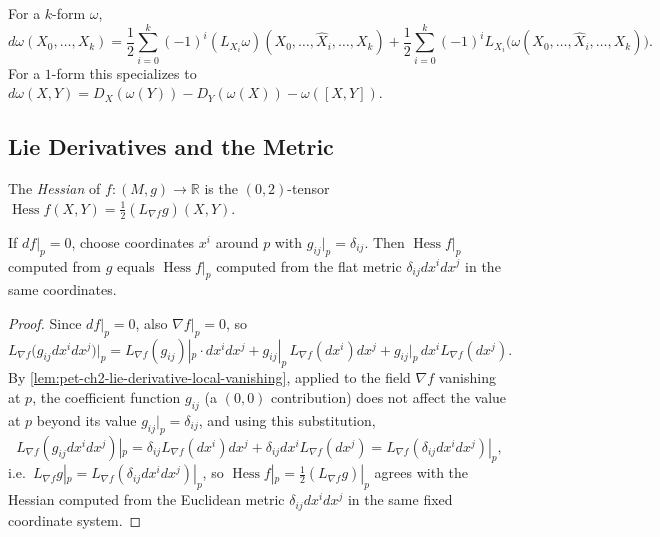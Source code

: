 \begin{definition}
  \label{def:pet-ch2-exterior-derivative-lie-formula}
  \leanok
  For a $k$-form $\omega$,
  \[
    d\omega(X_0,\dots,X_k)
    =\frac12\sum_{i=0}^k(-1)^i(L_{X_i}\omega)(X_0,\dots,\hat X_i,\dots,X_k)
    +\frac12\sum_{i=0}^k(-1)^iL_{X_i}\big(\omega(X_0,\dots,\hat X_i,\dots,X_k)\big).
  \]
  For a $1$-form this specializes to
  $d\omega(X,Y)=D_X(\omega(Y))-D_Y(\omega(X))-\omega([X,Y])$.
\end{definition}

\subsection{Lie Derivatives and the Metric}

\begin{definition}
  \label{def:pet-ch2-hessian-lie-derivative}
  \leanok
  The \emph{Hessian} of $f:(M,g)\to\mathbb{R}$ is the $(0,2)$-tensor
  $\operatorname{Hess}f(X,Y)=\frac12(L_{\nabla f}g)(X,Y)$.
\end{definition}

\begin{proposition}
  \label{prop:pet-ch2-hessian-critical-point}
  \leanok
  If $df|_p=0$, choose coordinates $x^i$ around $p$ with $g_{ij}|_p=\delta_{ij}$.
  Then $\operatorname{Hess}f|_p$ computed from $g$ equals $\operatorname{Hess}f|_p$
  computed from the flat metric $\delta_{ij}dx^idx^j$ in the same coordinates.
\end{proposition}
\begin{proof}
  \leanok
  Since $df|_p=0$, also $\nabla f|_p=0$, so
  \[
    L_{\nabla f}\big(g_{ij}dx^idx^j\big)\big|_p
    = L_{\nabla f}(g_{ij})|_p\cdot dx^idx^j+g_{ij}|_p\,L_{\nabla f}(dx^i)dx^j+g_{ij}|_p\,dx^iL_{\nabla f}(dx^j).
  \]
  By \cref{lem:pet-ch2-lie-derivative-local-vanishing}, applied to the field
  $\nabla f$ vanishing at $p$, the coefficient function $g_{ij}$ (a $(0,0)$
  contribution) does not affect the value at $p$ beyond its value
  $g_{ij}|_p=\delta_{ij}$, and using this substitution,
  \[
    L_{\nabla f}(g_{ij}dx^idx^j)|_p
    = \delta_{ij}L_{\nabla f}(dx^i)dx^j+\delta_{ij}dx^iL_{\nabla f}(dx^j)
    = L_{\nabla f}(\delta_{ij}dx^idx^j)|_p,
  \]
  i.e.\ $L_{\nabla f}g|_p=L_{\nabla f}(\delta_{ij}dx^idx^j)|_p$, so
  $\operatorname{Hess}f|_p=\frac12(L_{\nabla f}g)|_p$ agrees with the Hessian
  computed from the Euclidean metric $\delta_{ij}dx^idx^j$ in the same fixed
  coordinate system.
\end{proof}

